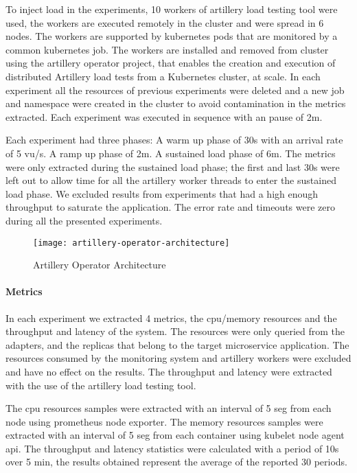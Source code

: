 To inject load in the experiments, 10 workers of artillery load testing tool were used,
the workers are executed remotely in the cluster and were spread in 6 nodes.
The workers are supported by kubernetes pods that are monitored by a common kubernetes job.
The workers are installed and removed from cluster using the artillery operator project, that enables
the creation and execution of distributed Artillery load tests from a Kubernetes cluster, at scale.
In each experiment all the resources of previous experiments were deleted and a new job and namespace were created in the
cluster to avoid contamination in the metrics extracted.
Each experiment was executed in sequence with an pause of 2m.

Each experiment had three phases:
A warm up phase of 30s with an arrival rate of 5 vu/s.
A ramp up phase of 2m.
A sustained load phase of 6m.
The metrics were only extracted during the sustained load phase;
the first and last 30s were left out to allow time for all the artillery worker threads to enter the sustained load phase.
We excluded results from experiments that had a high enough throughput to saturate the application.
The error rate and timeouts were zero during all the presented experiments.

\begin{figure}[htbp]
    \centering
    \texttt{[image: artillery-operator-architecture]}
    \caption{Artillery Operator Architecture}
    \label{fig:gantt}
\end{figure}

\paragraph{Metrics}

In each experiment we extracted 4 metrics, the cpu/memory resources and the throughput and latency of the system.
The resources were only queried from the adapters, and the replicas that belong to the target microservice application.
The resources consumed by the monitoring system and artillery workers were excluded and have no effect
on the results.
The throughput and latency were extracted with the use of the artillery load testing tool.

The cpu resources samples were extracted with an interval of 5 seg from each node using prometheus node exporter.
The memory resources samples were extracted with an interval of 5 seg from each container using kubelet node agent api.
The throughput and latency statistics were calculated with a period of 10s over 5 min, the results obtained represent the
average of the reported 30 periods.

